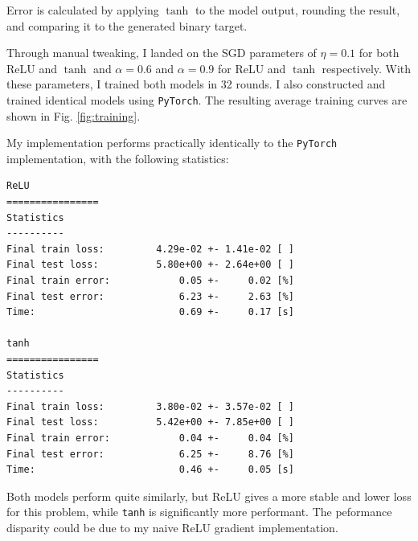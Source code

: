 \documentclass[prl, article, twocolumn]{revtex4-1}
\begin{document}
Error is calculated by applying $\tanh$ to the model output, rounding the result, and comparing it to the generated binary target.

Through manual tweaking, I landed on the SGD parameters of $\eta=0.1$ for both ReLU and $\tanh$ and $\alpha=0.6$ and $\alpha=0.9$ for ReLU and $\tanh$ respectively. With these parameters, I trained both models in 32 rounds. I also constructed and trained identical models using \texttt{PyTorch}. The resulting average training curves are shown in Fig. \ref{fig:training}.

My implementation performs practically identically to the \texttt{PyTorch} implementation, with the following statistics:
\pagebreak
\begin{verbatim}
ReLU
================
Statistics
----------
Final train loss:         4.29e-02 +- 1.41e-02 [ ]
Final test loss:          5.80e+00 +- 2.64e+00 [ ]
Final train error:            0.05 +-     0.02 [%]
Final test error:             6.23 +-     2.63 [%]
Time:                         0.69 +-     0.17 [s]

tanh
================
Statistics
----------
Final train loss:         3.80e-02 +- 3.57e-02 [ ]
Final test loss:          5.42e+00 +- 7.85e+00 [ ]
Final train error:            0.04 +-     0.04 [%]
Final test error:             6.25 +-     8.76 [%]
Time:                         0.46 +-     0.05 [s]
\end{verbatim}

Both models perform quite similarly, but ReLU gives a more stable and lower loss for this problem, while \texttt{tanh} is significantly more performant. The peformance disparity could be due to my naive ReLU gradient implementation.
\end{document}
